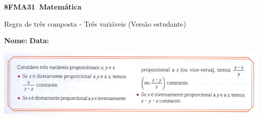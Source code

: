 \documentclass[a4paper,14pt]{article}
\begin{document}
	
	\noindent\textbf{8FMA31~Matemática} 
	
	\begin{center}Regra de três composta - Três variáveis (Versão estudante)
	\end{center}
	
	\noindent\textbf{Nome:} \underline{\hspace{10cm}}
	\noindent\textbf{Data:} \underline{\hspace{4cm}}
	
	
	\begin{center}
		\includegraphics[width=1\linewidth]{8FMA31_imagens/imagem1}
	\end{center}
	
\end{document}
